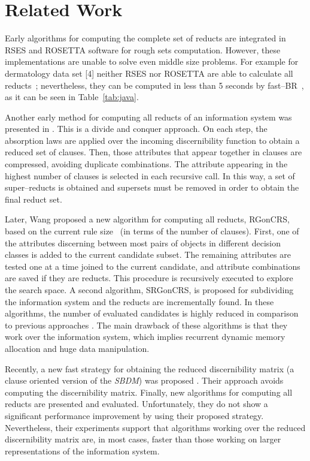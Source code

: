 \documentclass[number,preprint,review,12pt]{elsarticle}
\begin{document}
 
\section{Related Work}\label{relatedWork}

  Early algorithms for computing the complete set of reducts \citep{Bazan2001,Ohrn00} are integrated in RSES and ROSETTA software for rough sets computation. However, these implementations are unable to solve even middle size problems. For example for dermatology data set [4] neither RSES nor ROSETTA are able to calculate all reducts~\citep{Lazo15}; nevertheless, they can be computed in less than 5 seconds by fast--BR~\citep{Lias13}, as it can be seen in Table~\ref{tab:java}.

  Another early method for computing all reducts of an information system was presented in \cite{Starzyk99,Starzyk00}.  This is a divide and conquer approach. On each step, the absorption laws are applied over the incoming discernibility function to obtain a reduced set of clauses. Then, those attributes that appear together in  clauses are compressed, avoiding duplicate combinations. The attribute appearing in the highest number of clauses is selected in each recursive call. In this way, a set of super--reducts is obtained and supersets must be removed in order to obtain the final reduct set. 
   
  Later, Wang proposed a new algorithm for computing all reducts, RGonCRS, based on the current rule size~\cite{WangP07} (in terms of the number of clauses). First, one of the attributes discerning between most pairs of objects in different decision classes is added to the current candidate subset. The remaining attributes are tested one at a time joined to the current candidate, and attribute combinations are saved if they are reducts. This procedure is recursively executed to explore the search space. A second algorithm, SRGonCRS, is proposed for subdividing the information system and the reducts are incrementally found. In these algorithms, the number of evaluated candidates is highly reduced in comparison to previous approaches \citep{Bazan2001,Ohrn00}. The main drawback of these algorithms is that they work over the information system, which implies recurrent dynamic memory allocation and huge data manipulation.
  
  Recently, a new fast strategy for obtaining the reduced discernibility matrix (a clause oriented version of the \textit{SBDM}) was  proposed \cite{Chen2012}. Their approach avoids computing the discernibility matrix. Finally, new algorithms for computing all reducts are presented and evaluated. Unfortunately, they do not show a significant performance improvement by using their proposed strategy. Nevertheless, their experiments support that algorithms working over the reduced discernibility matrix are, in most cases, faster than those working on larger representations of the information system.
  
\end{document}
